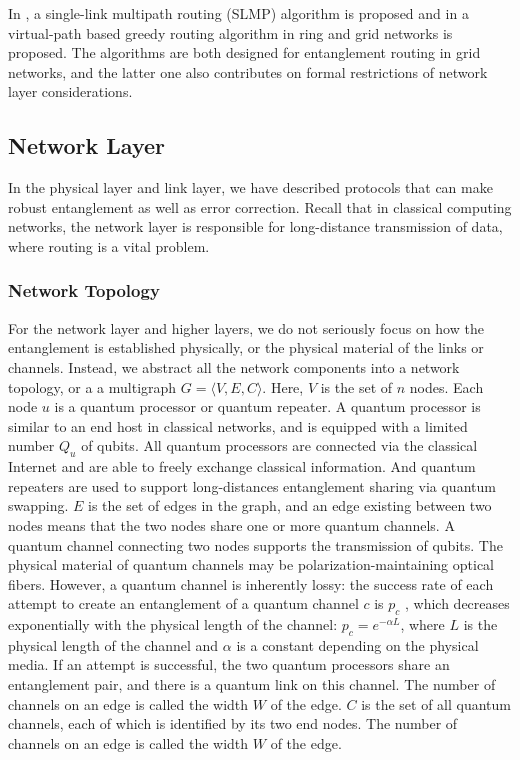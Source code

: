 \documentclass[10pt]{article}
\begin{document}
In \cite{pant2019routing}, a single-link multipath routing (SLMP) algorithm is proposed and in \cite{chakraborty2019distributed} a virtual-path based greedy routing algorithm in ring and grid networks is proposed. The algorithms are both designed for entanglement routing in grid networks, and the latter one also contributes on formal restrictions of network layer considerations.


\subsection{Network Layer}

In the physical layer and link layer, we have described protocols that can make robust entanglement as well as error correction. Recall that in classical computing networks, the network layer is responsible for long-distance transmission of data, where routing is a vital problem.

\subsubsection{Network Topology}
For the network layer and higher layers, we do not seriously focus on how the entanglement is established physically, or the physical material of the links or channels. Instead, we abstract all the network components into a network topology, or a a multigraph $G = \langle V, E,C\rangle$. Here, $V$ is the set of $n$ nodes. Each node $u$ is a quantum processor or quantum repeater. A quantum processor is similar to an end host in classical networks, and is equipped with a limited number $Q_u$ of qubits. All quantum processors are connected via the classical Internet and are able to freely exchange classical information. And quantum repeaters are used to support long-distances entanglement sharing via quantum swapping. $E$ is the set of edges in the graph, and an edge existing between two nodes means that the two nodes share one or more quantum channels. A quantum channel connecting two nodes supports the transmission of qubits. The physical material of quantum channels may be polarization-maintaining optical fibers.
However, a quantum channel is inherently lossy: the success rate of each attempt to create an entanglement of a quantum channel $c$ is $p_c$ , which decreases exponentially with the physical length of the channel: $p_c = e ^{-\alpha L}$, where $L$ is the physical length of the channel and $\alpha$ is a constant depending on the physical media. If an attempt is successful, the two quantum processors share an entanglement pair, and there is a quantum link on this channel. The number of channels on an edge is called the width $W$ of the edge. $C$ is the set of all quantum channels, each of which is identified by its two end nodes. The number of channels on an edge is called the width $W$ of the edge.
\end{document}
